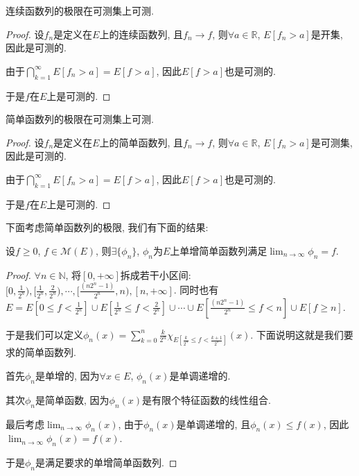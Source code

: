 \documentclass[theorem=false,mathfont=none,openany,sub3section]{easybook}
\begin{document}
\begin{lemma}
  连续函数列的极限在可测集上可测.\par
\end{lemma}

\begin{proof}
  设$f_n$是定义在$E$上的连续函数列, 且$f_n\to f$, 则$\forall a\in \mathbb{R}$, $E[f_n>a]$是开集, 因此是可测的.\par
  由于$\bigcap_{k=1}^{\infty}E[f_n> a]=E[f>a]$, 因此$E[f>a]$也是可测的.\par
  于是$f$在$E$上是可测的.\par
\end{proof}

\begin{corollary}
  简单函数列的极限在可测集上可测.\par
\end{corollary}

\begin{proof}
  设$f_n$是定义在$E$上的简单函数列, 且$f_n\to f$, 则$\forall a\in \mathbb{R}$, $E[f_n>a]$是可测集, 因此是可测的.\par
  由于$\bigcap_{k=1}^{\infty}E[f_n> a]=E[f>a]$, 因此$E[f>a]$也是可测的.\par
  于是$f$在$E$上是可测的.\par
\end{proof}

下面考虑简单函数列的极限, 我们有下面的结果:\par

\begin{theorem}
  设$f\geqslant 0$, $f\in \mathcal{M}(E)$, 则$\exists \{\phi_n\}$, $\phi_n$为$E$上单增简单函数列满足$\lim_{n \to \infty} \phi_n = f$.\par
\end{theorem}

\begin{proof}
  $\forall n \in \mathbb{N}$, 将$[0,+\infty]$拆成若干小区间: $[0,\frac{1}{2^n}), [\frac{1}{2^n}, \frac{2}{2^n}), \cdots, [\frac{(n2^n-1)}{2^n},n),[n,+\infty]$.
  同时也有$E=E[0\leqslant f<\frac{1}{2^n}]\cup E[\frac{1}{2^n}\leqslant f<\frac{2}{2^n}]\cup \cdots \cup E[\frac{(n2^n-1)}{2^n}\leqslant f<n]\cup E[f\geqslant n]$.\par
  于是我们可以定义$\phi_n(x)=\sum_{k=0}^{n} \frac{k}{2^n}\chi_{E[\frac{k}{2^n}\leqslant f<\frac{k+1}{2^n}]}(x)$. 下面说明这就是我们要求的简单函数列.\par
  首先$\phi_n$是单增的, 因为$\forall x\in E$, $\phi_n(x)$是单调递增的.\par
  其次$\phi_n$是简单函数, 因为$\phi_n(x)$是有限个特征函数的线性组合.\par
  最后考虑$\lim_{n \to \infty} \phi_n(x)$, 由于$\phi_n(x)$是单调递增的, 且$\phi_n(x)\leqslant f(x)$, 因此$\lim_{n \to \infty} \phi_n(x) = f(x)$.\par
  于是$\phi_n$是满足要求的单增简单函数列.\par
\end{proof}
\end{document}

